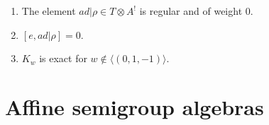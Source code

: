 \documentclass[11pt,fleqn]{article}
\newcommand\ot{\otimes}
\begin{document}
\begin{Lemma}
\begin{enumerate}
	\item The element $ad|\rho \in T \ot A^!$ is regular and of weight $0$.
	\item $[e,ad|\rho] = 0$.
	\item $K_w$ is exact for $w \notin \langle (0,1,-1)\rangle$.
\end{enumerate}
\end{Lemma}

\newpage

\section{Affine semigroup algebras}
\end{document}
